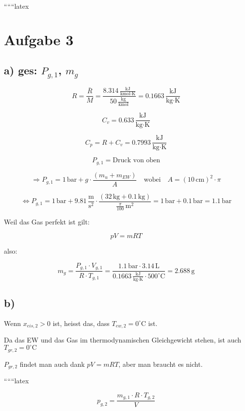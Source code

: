 
``````latex


\section*{Aufgabe 3}

\subsection*{a) ges: $P_{g,1}$, $m_g$}

\[
R = \frac{\bar{R}}{M} = \frac{8.314 \, \frac{\text{kJ}}{\text{kmol} \cdot \text{K}}}{50 \, \frac{\text{kg}}{\text{kmol}}} = 0.1663 \, \frac{\text{kJ}}{\text{kg} \cdot \text{K}}
\]

\[
C_v = 0.633 \, \frac{\text{kJ}}{\text{kg} \cdot \text{K}}
\]

\[
C_p = R + C_v = 0.7993 \, \frac{\text{kJ}}{\text{kg} \cdot \text{K}}
\]

\[
P_{g,1} = \text{Druck von oben}
\]

\[
\Rightarrow P_{g,1} = 1 \, \text{bar} + g \cdot \frac{(m_u + m_{EW})}{A} \quad \text{wobei} \quad A = (10 \, \text{cm})^2 \cdot \pi
\]

\[
\Leftrightarrow P_{g,1} = 1 \, \text{bar} + 9.81 \, \frac{\text{m}}{\text{s}^2} \cdot \frac{(32 \, \text{kg} + 0.1 \, \text{kg})}{\frac{\pi}{100} \, \text{m}^2} = 1 \, \text{bar} + 0.1 \, \text{bar} = 1.1 \, \text{bar}
\]

Weil das Gas perfekt ist gilt:

\[
pV = mRT
\]

also:

\[
m_g = \frac{P_{g,1} \cdot V_{g,1}}{R \cdot T_{g,1}} = \frac{1.1 \, \text{bar} \cdot 3.14 \, \text{L}}{0.1663 \, \frac{\text{kJ}}{\text{kg} \cdot \text{K}} \cdot 500^\circ \text{C}} = 2.688 \, \text{g}
\]

\subsection*{b)}

Wenn $x_{eis,2} > 0$ ist, heisst das, dass $T_{ew,2} = 0^\circ \text{C}$ ist.

Da das EW und das Gas im thermodynamischen Gleichgewicht stehen, ist auch $T_{gr,2} = 0^\circ \text{C}$

$P_{gr,2}$ findet man auch dank $pV = mRT$, aber man braucht es nicht.

``````latex


\[
p_{g,2} = \frac{m_{g,1} \cdot R \cdot T_{g,2}}{V}
\]

